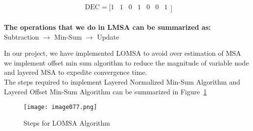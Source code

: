 \[ \begin{matrix}\text{DEC}=[1&1&0&1&0&0&1\\\end{matrix}] \]
\begin{GrayBox}
    \textbf{The operations that we do in LMSA can be summarized as:}\\
    Subtraction $\rightarrow$ Min-Sum $\rightarrow$ Update
\end{GrayBox}
In our project, we have implemented LOMSA to avoid over estimation of MSA we implement  offset min sum algorithm to reduce the magnitude of variable node and layered MSA to expedite convergence time. \\
The steps required to implement Layered Normalized Min-Sum Algorithm and Layered Oﬀset Min-Sum Algorithm can be summarized in Figure~\ref{fig:LOMSA Algorithm}
\begin{figure}[ht]
    \centering
    \texttt{[image: image077.png]}
    \caption{Steps for LOMSA Algorithm}
    \label{fig:LOMSA Algorithm}
\end{figure}

